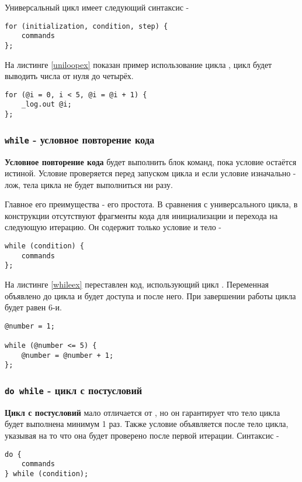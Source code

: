 \documentclass[a4paper, 14pt]{extarticle}
\begin{document}
Универсальный цикл имеет следующий синтаксис -
\begin{lstlisting}[numbers=none]
for (initialization, condition, step) {
	commands
};
\end{lstlisting}

На листинге \ref{uniloopex} показан пример использование цикла , цикл будет выводить числа от нуля до четырёх.

\begin{lstlisting}[caption=Универсальный цикл, label=uniloopex]
for (@i = 0, i < 5, @i = @i + 1) {
	_log.out @i;
};
\end{lstlisting}

\subsubsection{\lstinline`while` - условное повторение кода}

{\bf Условное повторение кода} будет выполнить блок команд, пока условие остаётся истиной. Условие проверяется перед запуском цикла и если условие изначально - лож, тела цикла не будет выполниться ни разу.

Главное его преимущества - его простота. В сравнения с универсального цикла, в конструкции  отсутствуют фрагменты кода для инициализации и перехода на следующую итерацию. Он содержит только условие и тело -
\begin{lstlisting}[numbers=none]
while (condition) {
	commands
};
\end{lstlisting}

На листинге \ref{whileex} переставлен код, использующий цикл . Переменная  объявлено до цикла и будет доступа и после него. При завершении работы цикла  будет равен 6-и.

\begin{lstlisting}[caption=Цикл while, label=whileex]
@number = 1;

while (@number <= 5) {
	@number = @number + 1;
};
\end{lstlisting}

\subsubsection{\lstinline`do while` - цикл с постусловий}

{\bf Цикл с постусловий} мало отличается от , но он гарантирует что тело цикла будет выполнена минимум 1 раз. Также условие объявляется после тело цикла, указывая на то что она будет проверено после первой итерации. Синтаксис -
\begin{lstlisting}[numbers=none]
do {
	commands
} while (condition);
\end{lstlisting}
\end{document}
